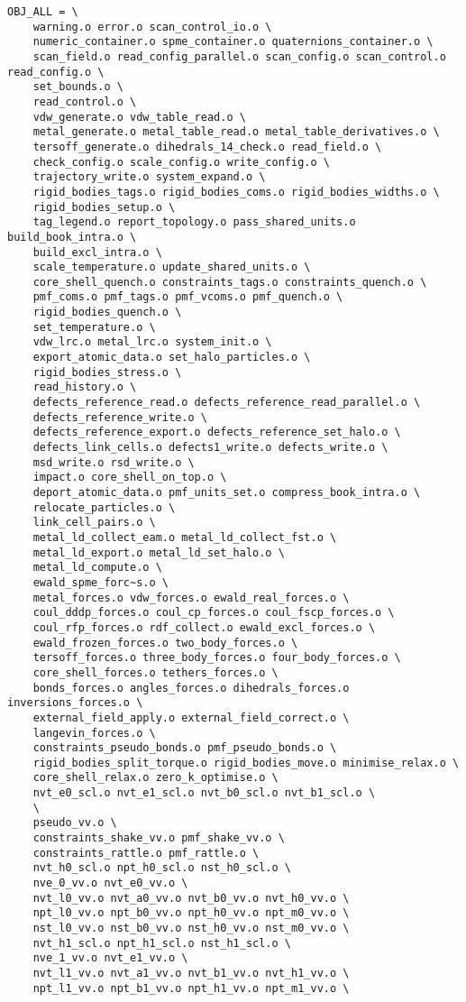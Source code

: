 \begin{verbatim}
OBJ_ALL = \
	warning.o error.o scan_control_io.o \
	numeric_container.o spme_container.o quaternions_container.o \
	scan_field.o read_config_parallel.o scan_config.o scan_control.o read_config.o \
	set_bounds.o \
	read_control.o \
	vdw_generate.o vdw_table_read.o \
	metal_generate.o metal_table_read.o metal_table_derivatives.o \
	tersoff_generate.o dihedrals_14_check.o read_field.o \
	check_config.o scale_config.o write_config.o \
	trajectory_write.o system_expand.o \
	rigid_bodies_tags.o rigid_bodies_coms.o rigid_bodies_widths.o \
	rigid_bodies_setup.o \
	tag_legend.o report_topology.o pass_shared_units.o build_book_intra.o \
	build_excl_intra.o \
	scale_temperature.o update_shared_units.o \
	core_shell_quench.o constraints_tags.o constraints_quench.o \
	pmf_coms.o pmf_tags.o pmf_vcoms.o pmf_quench.o \
	rigid_bodies_quench.o \
	set_temperature.o \
	vdw_lrc.o metal_lrc.o system_init.o \
	export_atomic_data.o set_halo_particles.o \
	rigid_bodies_stress.o \
	read_history.o \
	defects_reference_read.o defects_reference_read_parallel.o \
	defects_reference_write.o \
	defects_reference_export.o defects_reference_set_halo.o \
	defects_link_cells.o defects1_write.o defects_write.o \
	msd_write.o rsd_write.o \
	impact.o core_shell_on_top.o \
	deport_atomic_data.o pmf_units_set.o compress_book_intra.o \
	relocate_particles.o \
	link_cell_pairs.o \
	metal_ld_collect_eam.o metal_ld_collect_fst.o \
	metal_ld_export.o metal_ld_set_halo.o \
	metal_ld_compute.o \
	ewald_spme_forc~s.o \
	metal_forces.o vdw_forces.o ewald_real_forces.o \
	coul_dddp_forces.o coul_cp_forces.o coul_fscp_forces.o \
	coul_rfp_forces.o rdf_collect.o ewald_excl_forces.o \
	ewald_frozen_forces.o two_body_forces.o \
	tersoff_forces.o three_body_forces.o four_body_forces.o \
	core_shell_forces.o tethers_forces.o \
	bonds_forces.o angles_forces.o dihedrals_forces.o inversions_forces.o \
	external_field_apply.o external_field_correct.o \
	langevin_forces.o \
	constraints_pseudo_bonds.o pmf_pseudo_bonds.o \
	rigid_bodies_split_torque.o rigid_bodies_move.o minimise_relax.o \
	core_shell_relax.o zero_k_optimise.o \
	nvt_e0_scl.o nvt_e1_scl.o nvt_b0_scl.o nvt_b1_scl.o \
	\
	pseudo_vv.o \
	constraints_shake_vv.o pmf_shake_vv.o \
	constraints_rattle.o pmf_rattle.o \
	nvt_h0_scl.o npt_h0_scl.o nst_h0_scl.o \
	nve_0_vv.o nvt_e0_vv.o \
	nvt_l0_vv.o nvt_a0_vv.o nvt_b0_vv.o nvt_h0_vv.o \
	npt_l0_vv.o npt_b0_vv.o npt_h0_vv.o npt_m0_vv.o \
	nst_l0_vv.o nst_b0_vv.o nst_h0_vv.o nst_m0_vv.o \
	nvt_h1_scl.o npt_h1_scl.o nst_h1_scl.o \
	nve_1_vv.o nvt_e1_vv.o \
	nvt_l1_vv.o nvt_a1_vv.o nvt_b1_vv.o nvt_h1_vv.o \
	npt_l1_vv.o npt_b1_vv.o npt_h1_vv.o npt_m1_vv.o \

\end{verbatim}
